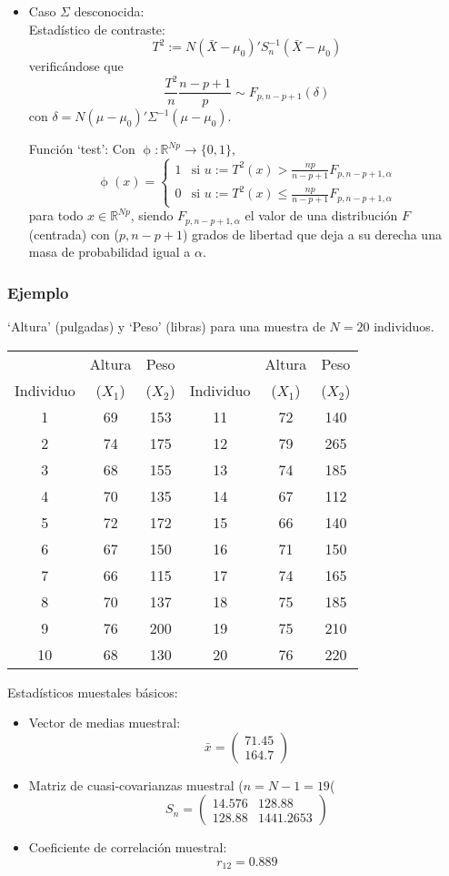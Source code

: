 \documentclass[11pt,a4paper]{article}
\begin{document}
\begin{itemize}
\item Caso $\Sigma$ desconocida: \\
Estadístico de contraste:
$$T^{2} := N(\bar{X} - \mu_{0})' S_{n}^{-1} (\bar{X} - \mu_{0})$$
verificándose que
$$\frac{T^{2}}{n} \frac{n-p+1}{p} \sim F_{p, n-p+1}(\delta)$$
con $\delta = N(\mu-\mu_{0})' \Sigma^{-1} (\mu-\mu_{0})$.

Función `test': Con $\upphi: \mathbb{R}^{Np} \to \{0, 1\}$,
$$\upphi(x) = \begin{cases}
1 & \text{si } u := T^{2}(x) > \frac{np}{n-p+1}F_{p,n-p+1,\alpha} \\
0 & \text{si } u := T^{2}(x) \leq \frac{np}{n-p+1}F_{p,n-p+1,\alpha}
\end{cases}$$
para todo $x \in \mathbb{R}^{Np}$, siendo $F_{p, n-p+1, \alpha}$ el valor de una distribución $F$ (centrada) con ($p, n-p+1$) grados de libertad que deja a su derecha una masa de probabilidad igual a $\alpha$.
\end{itemize}

\subsubsection{Ejemplo}
`Altura' (pulgadas) y `Peso' (libras) para una muestra de $N = 20$ individuos.
\begin{center}
\begin{tabular}{|c|cc||c|cc|}
\hline
& Altura & Peso & & Altura & Peso \\
Individuo & ($X_{1}$) & ($X_{2}$) & Individuo & ($X_{1}$) & ($X_{2}$) \\ \hline
1 & 69 & 153 & 11 & 72 & 140 \\
2 & 74 & 175 & 12 & 79 & 265 \\
3 & 68 & 155 & 13 & 74 & 185 \\
4 & 70 & 135 & 14 & 67 & 112 \\
5 & 72 & 172 & 15 & 66 & 140 \\
6 & 67 & 150 & 16 & 71 & 150 \\
7 & 66 & 115 & 17 & 74 & 165 \\
8 & 70 & 137 & 18 & 75 & 185 \\
9 & 76 & 200 & 19 & 75 & 210 \\
10 & 68 & 130 & 20 & 76 & 220 \\ \hline
\end{tabular}
\end{center}

Estadísticos muestales básicos:
\begin{itemize}
\item Vector de medias muestral:
$$\bar{x} = \begin{pmatrix} 71.45 \\ 164.7 \end{pmatrix}$$
\item Matriz de cuasi-covarianzas muestral ($n = N-1 = 19$(
$$S_{n} = \begin{pmatrix}
14.576 & 128.88 \\
128.88 & 1441.2653
\end{pmatrix}$$
\item Coeficiente de correlación muestral:
$$r_{12} = 0.889$$
\end{itemize}
\end{document}
